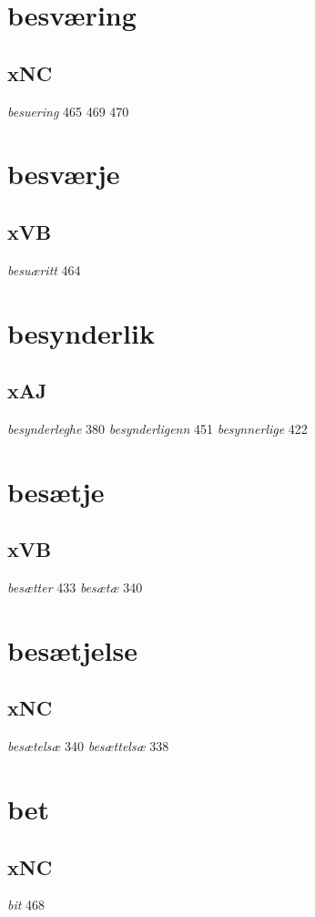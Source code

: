 \documentclass[a4paper,twocolumn]{article}
\begin{document}
\section{besværing}
\label{sec:orgcc74c1b}
\subsection{xNC}
\label{sec:orgb05d6b7}
\emph{besuering} 465 469 470 
\section{besværje}
\label{sec:org56d4357}
\subsection{xVB}
\label{sec:org2a62884}
\emph{besuæritt} 464 
\section{besynderlik}
\label{sec:orgf7c87c7}
\subsection{xAJ}
\label{sec:org3dd0629}
\emph{besynderleghe} 380 \emph{besynderligenn} 451 \emph{besynnerlige} 422 
\section{besætje}
\label{sec:orgea864c6}
\subsection{xVB}
\label{sec:org8bf42bb}
\emph{besætter} 433 \emph{besætæ} 340 
\section{besætjelse}
\label{sec:org68bb210}
\subsection{xNC}
\label{sec:org742d29c}
\emph{besætelsæ} 340 \emph{besættelsæ} 338 
\section{bet}
\label{sec:orge9f4a65}
\subsection{xNC}
\label{sec:org1fae5fd}
\emph{bit} 468 
\end{document}
